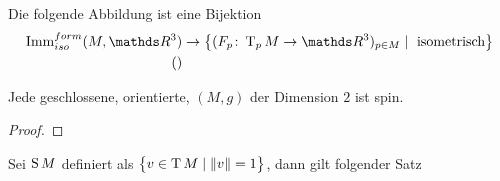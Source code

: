 \begin{Lem}
	Die folgende Abbildung ist eine Bijektion
	\begin{align*}
		\Immfi{M}{\R^3} &\rightarrow \set{ (\abb{F_p}{\T_pM}{\R^3})_{p\in M} }{\text{ isometrisch}}\\
		()
	\end{align*}
\end{Lem}


\begin{Satz}
	Jede geschlossene, orientierte, \RMF  $(M,g)$ der Dimension $2$ ist spin.
	\begin{proof}
	\end{proof}
\end{Satz}

Sei $\S M$ definiert als $\set{v \in \T M}{ \norm{v} = 1}$, dann
gilt folgender Satz

